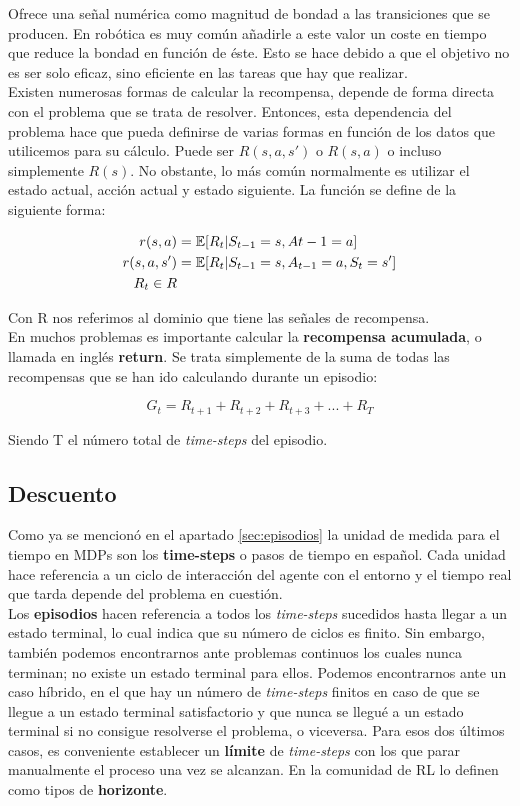 \documentclass[11pt,fleqn]{book} %
\begin{document}
Ofrece una señal numérica como magnitud de bondad a las transiciones que se producen. En robótica es muy común añadirle a este valor un coste en tiempo que reduce la bondad en función de éste. Esto se hace debido a que el objetivo no es ser solo eficaz, sino eficiente en las tareas que hay que realizar. \\

Existen numerosas formas de calcular la recompensa, depende de forma directa con el problema que se trata de resolver. Entonces, esta dependencia del problema hace que pueda definirse de varias formas en función de los datos que utilicemos para su cálculo. Puede ser $R(s,a,s')$ o $R(s,a)$ o incluso simplemente $R(s)$. No obstante, lo más común normalmente es utilizar el estado actual, acción actual y estado siguiente. La función se define de la siguiente forma:

\begin{align*}
r(s,a)&=\operatorname*{\mathbb{E}}[R_t|S_{t-1}=s,A{t-1}=a]\\
r(s,a,s')&=\operatorname*{\mathbb{E}}[R_t|S_{t-1}=s,A_{t-1}=a,S_t=s']\\
R_t \in R
\end{align*}

Con R nos referimos al dominio que tiene las señales de recompensa.\\

En muchos problemas es importante calcular la \textbf{recompensa acumulada}, o llamada en inglés \textbf{return}. Se trata simplemente de la suma de todas las recompensas que se han ido calculando durante un episodio:

\begin{equation*}
G_t=R_{t+1}+R_{t+2}+R_{t+3}+...+R_T
\end{equation*}

Siendo T el número total de \textit{time-steps} del episodio.

\subsection{Descuento}

Como ya se mencionó en el apartado \ref{sec:episodios} la unidad de medida para el tiempo en MDPs son los \textbf{time-steps} o pasos de tiempo en español. Cada unidad hace referencia a un ciclo de interacción del agente con el entorno y el tiempo real que tarda depende del problema en cuestión. \\

Los \textbf{episodios} hacen referencia a todos los \textit{time-steps} sucedidos hasta llegar a un estado terminal, lo cual indica que su número de ciclos es finito. Sin embargo, también podemos encontrarnos ante problemas continuos los cuales nunca terminan; no existe un estado terminal para ellos. Podemos encontrarnos ante un caso híbrido, en el que hay un número de \textit{time-steps} finitos en caso de que se llegue a un estado terminal satisfactorio y que nunca se llegué a un estado terminal si no consigue resolverse el problema, o viceversa. Para esos dos últimos casos, es conveniente establecer un \textbf{límite} de \textit{time-steps} con los que parar manualmente el proceso una vez se alcanzan. En la comunidad de RL lo definen como tipos de \textbf{horizonte}.\\
\end{document}
